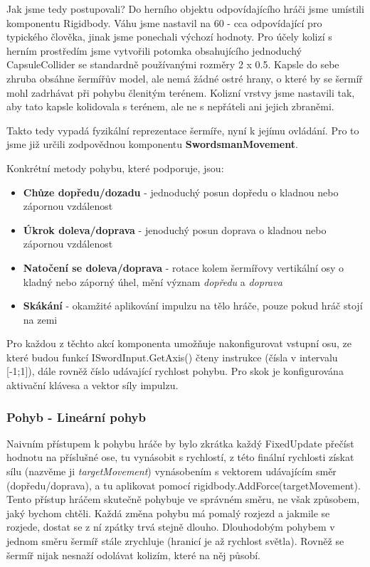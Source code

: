 Jak jsme tedy postupovali? Do herního objektu odpovídajícího hráči jsme umístili komponentu Rigidbody. Váhu jsme nastavil na 60 - cca odpovídající pro typického člověka, jinak jsme ponechali výchozí hodnoty. Pro účely kolizí s herním prostředím jsme vytvořili potomka obsahujícího jednoduchý CapsuleCollider se standardně používanými rozměry 2 x 0.5. Kapsle do sebe zhruba obsáhne šermířův model, ale nemá žádné ostré hrany, o které by se šermíř mohl zadrhávat při pohybu členitým terénem. Kolizní vrstvy jsme nastavili tak, aby tato kapsle kolidovala s terénem, ale ne s nepřáteli ani jejich zbraněmi.

Takto tedy vypadá fyzikální reprezentace šermíře, nyní k jejímu ovládání. Pro to jsme již určili zodpovědnou komponentu \textbf{SwordsmanMovement}. 

Konkrétní metody pohybu, které podporuje, jsou:
\begin{itemize}
  \item \textbf{Chůze dopředu/dozadu} - jednoduchý posun dopředu o kladnou nebo zápornou vzdálenost
  \item \textbf{Úkrok doleva/doprava} - jenoduchý posun doprava o kladnou nebo zápornou vzdálenost
  \item \textbf{Natočení se doleva/doprava} - rotace kolem šermířovy vertikální osy o kladný nebo záporný úhel, mění význam \textit{dopředu} a \textit{doprava}
  \item \textbf{Skákání} - okamžité aplikování impulzu na tělo hráče, pouze pokud hráč stojí na zemi
\end{itemize}

Pro každou z těchto akcí komponenta umožňuje nakonfigurovat vstupní osu, ze které budou funkcí ISwordInput.GetAxis() čteny instrukce (čísla v intervalu [-1;1]), dále rovněž číslo udávající rychlost pohybu. Pro skok je konfigurována aktivační klávesa a vektor síly impulzu.

\subsubsection*{Pohyb - Lineární pohyb}

Naivním přístupem k pohybu hráče by bylo zkrátka každý FixedUpdate přečíst hodnotu na příslušné ose, tu vynásobit s rychlostí, z této finální rychlosti získat sílu (nazvěme ji \textit{targetMovement}) vynásobením s vektorem udávajícím směr (dopředu/doprava), a tu aplikovat pomocí rigidbody.AddForce(targetMovement).
Tento přístup hráčem skutečně pohybuje ve správném směru, ne však způsobem, jaký bychom chtěli. Každá změna pohybu má pomalý rozjezd a jakmile se rozjede, dostat se z ní zpátky trvá stejně dlouho. Dlouhodobým pohybem v jednom směru šermíř stále zrychluje (hranicí je až rychlost světla). Rovněž se šermíř nijak nesnaží odolávat kolizím, které na něj působí. 

